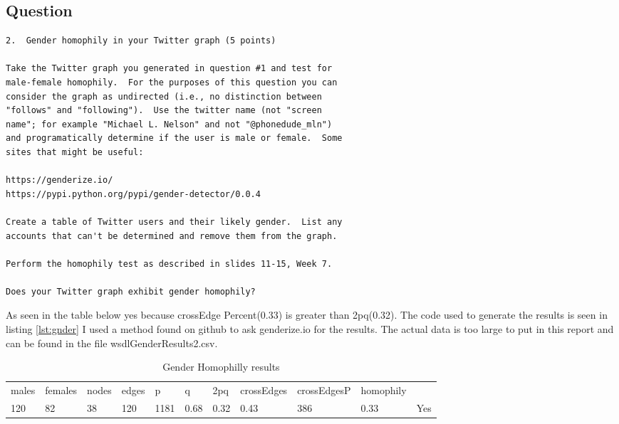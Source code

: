 \documentclass[letterpaper,10pt]{article}
\begin{document}
\subsection*{Question}
\begin{verbatim}
2.  Gender homophily in your Twitter graph (5 points)

Take the Twitter graph you generated in question #1 and test for
male-female homophily.  For the purposes of this question you can
consider the graph as undirected (i.e., no distinction between
"follows" and "following").  Use the twitter name (not "screen
name"; for example "Michael L. Nelson" and not "@phonedude_mln")
and programatically determine if the user is male or female.  Some
sites that might be useful:

https://genderize.io/
https://pypi.python.org/pypi/gender-detector/0.0.4

Create a table of Twitter users and their likely gender.  List any 
accounts that can't be determined and remove them from the graph.

Perform the homophily test as described in slides 11-15, Week 7.

Does your Twitter graph exhibit gender homophily?
\end{verbatim}

As seen in the table below yes because crossEdge Percent(0.33) is greater than 2pq(0.32).
The code used to generate the results is seen in listing \ref{lst:gnder}
I used a method found on github to ask genderize.io for the results.
The actual data is too large to put in this report and can be found in the file wsdlGenderResults2.csv.
\begin{table}[]
\centering
\caption{Gender Homophilly results}
\label{my-label}
\begin{tabular}{lllllllllll}
males & females & nodes & edges & p    & q    & 2pq  & crossEdges & crossEdgesP & homophily &     \\
120   & 82      & 38    & 120   & 1181 & 0.68 & 0.32 & 0.43       & 386         & 0.33      & Yes
\end{tabular}
\end{table}

\newpage
\newpage
      
\newpage

\newpage
           
\newpage
           
\newpage
\end{document}
